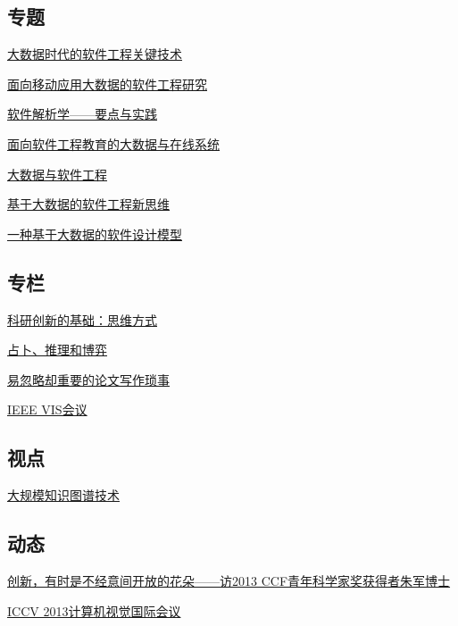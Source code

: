 \documentclass[a4paper]{article}
\begin{document}
\subsection{专题}
\href{http://history.ccf.org.cn/resources/1190201776262/2014/03/11/1.pdf}{大数据时代的软件工程关键技术}

\href{http://history.ccf.org.cn/resources/1190201776262/2014/03/11/3.pdf}{面向移动应用大数据的软件工程研究}

\href{http://history.ccf.org.cn/resources/1190201776262/2014/03/11/4.pdf}{软件解析学——要点与实践}

\href{http://history.ccf.org.cn/resources/1190201776262/2014/03/11/6.pdf}{面向软件工程教育的大数据与在线系统}

\href{http://history.ccf.org.cn/resources/1190201776262/2014/03/10/0.pdf}{大数据与软件工程}

\href{http://history.ccf.org.cn/resources/1190201776262/2014/03/11/5.pdf}{基于大数据的软件工程新思维}

\href{http://history.ccf.org.cn/resources/1190201776262/2014/03/11/2.pdf}{一种基于大数据的软件设计模型}

\subsection{专栏}
\href{http://history.ccf.org.cn/resources/1190201776262/2014/03/11/7.pdf}{科研创新的基础：思维方式}

\href{http://history.ccf.org.cn/resources/1190201776262/2014/03/11/8.pdf}{占卜、推理和博弈}

\href{http://history.ccf.org.cn/resources/1190201776262/2014/03/11/9.pdf}{易忽略却重要的论文写作琐事}

\href{http://history.ccf.org.cn/resources/1190201776262/2014/03/11/10.pdf}{IEEE VIS会议}

\subsection{视点}
\href{http://history.ccf.org.cn/resources/1190201776262/2014/03/11/11.pdf}{大规模知识图谱技术}

\subsection{动态}
\href{http://history.ccf.org.cn/resources/1190201776262/2014/03/11/12.pdf}{创新，有时是不经意间开放的花朵——访2013 CCF青年科学家奖获得者朱军博士}

\href{http://history.ccf.org.cn/resources/1190201776262/2014/03/11/13.pdf}{ICCV 2013计算机视觉国际会议}
\end{document}
